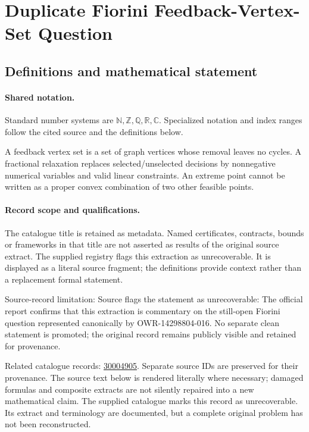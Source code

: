 \documentclass[11pt]{article}
\begin{document}
\section{Duplicate Fiorini Feedback-Vertex-Set Question}\label{statement}

\subsection{Definitions and mathematical statement}

\paragraph{Shared notation.}Standard number systems are $\mathbb N,\mathbb Z,\mathbb Q,\mathbb R,\mathbb C$. Specialized notation and index ranges follow the cited source and the definitions below.


A feedback vertex set is a set of graph vertices whose removal leaves no cycles. A fractional relaxation replaces selected/unselected decisions by nonnegative numerical variables and valid linear constraints. An extreme point cannot be written as a proper convex combination of two other feasible points.
\paragraph{Record scope and qualifications.}
The catalogue title is retained as metadata. Named certificates, contracts, bounds or frameworks in that title are not asserted as results of the original source extract.
The supplied registry flags this extraction as unrecoverable. It is displayed as a literal source fragment; the definitions provide context rather than a replacement formal statement.

Source-record limitation: Source flags the statement as unrecoverable: The official report confirms that this extraction is commentary on the still-open Fiorini question represented canonically by OWR-14298804-016. No separate clean statement is promoted; the original record remains publicly visible and retained for provenance.

Related catalogue records: \href{https://mehmetmars7.github.io/Erdosproblems-llm-hunter/problem.html?type=open_problems&id=30004905}{30004905}. Separate source IDs are preserved for their provenance.
The source text below is rendered literally where necessary; damaged formulas and composite extracts are not silently repaired into a new mathematical claim.
The supplied catalogue marks this record as unrecoverable. Its extract and terminology are documented, but a complete original problem has not been reconstructed.
\end{document}
